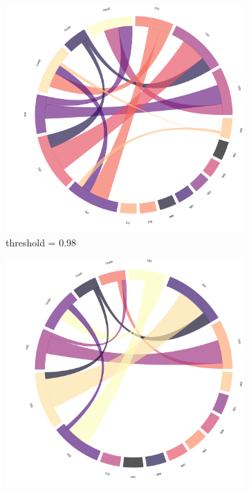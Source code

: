 \begin{figure}[!ht]
	\begin{subfigure}[b]{0.3\linewidth}
		\includegraphics[width=\linewidth]{figures/chords/chord_swap_Ensemble1000_RCN5333300_098.png}
		\caption{threshold = 0.98}
	\end{subfigure}
	\hfill
	\begin{subfigure}[b]{0.3\linewidth}
		\includegraphics[width=\linewidth]{figures/chords/chord_swap_Ensemble1000_RCN5333300_099.png}

\end{subfigure}
\end{figure}
